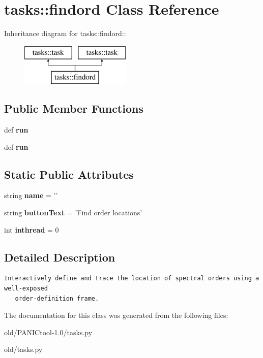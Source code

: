 \section{tasks::findord Class Reference}
\label{classtasks_1_1findord}
Inheritance diagram for tasks::findord::\begin{figure}[H]
\begin{center}
\leavevmode
\includegraphics[height=2cm]{classtasks_1_1findord}
\end{center}
\end{figure}
\subsection*{Public Member Functions}
\begin{CompactItemize}
\item 
def \textbf{run}\label{classtasks_1_1findord_c3bc59827b3a103e304b1d2959296922}

\item 
def \textbf{run}\label{classtasks_1_1findord_c3bc59827b3a103e304b1d2959296922}

\end{CompactItemize}
\subsection*{Static Public Attributes}
\begin{CompactItemize}
\item 
string \textbf{name} = '{\bffindord}'\label{classtasks_1_1findord_f797d3fbbf58f8e94ef934c59ec7bc7c}

\item 
string \textbf{button\-Text} = 'Find order locations'\label{classtasks_1_1findord_9564a941d92e9a18c30bc7e5b3bf71c2}

\item 
int \textbf{inthread} = 0\label{classtasks_1_1findord_8dda8a8044b3c1806c5ae86930f977f9}

\end{CompactItemize}


\subsection{Detailed Description}


\footnotesize\begin{verbatim}Interactively define and trace the location of spectral orders using a well-exposed
   order-definition frame. 
\end{verbatim}
\normalsize
 



The documentation for this class was generated from the following files:\begin{CompactItemize}
\item 
old/PANICtool-1.0/tasks.py\item 
old/tasks.py\end{CompactItemize}
